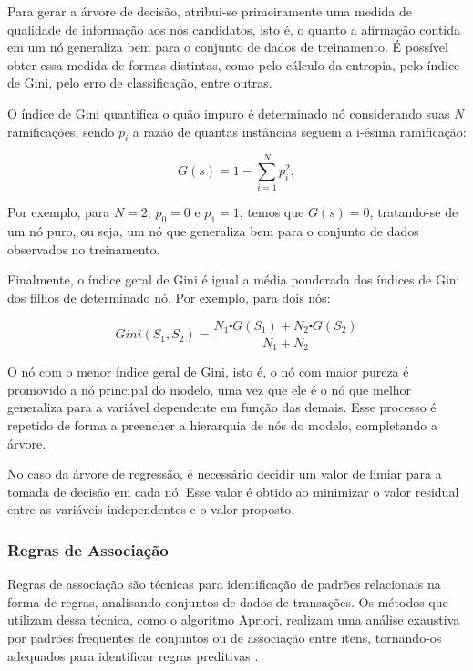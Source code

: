 Para gerar a árvore de decisão, atribui-se primeiramente uma medida de qualidade
de informação aos nós candidatos, isto é, o quanto a afirmação contida em um nó
generaliza bem para o conjunto de dados de treinamento. É possível obter essa
medida de formas distintas, como pelo cálculo da entropia, pelo índice de Gini,
pelo erro de classificação, entre outras.

O índice de Gini quantifica o
quão impuro é determinado nó considerando suas $N$ ramificações, sendo $p_i$
a razão de quantas instâncias seguem a i-ésima ramificação:

\begin{equation}
    G(s) = 1 - \sum_{i=1}^{N} p_{i}^{2},
\end{equation}

Por exemplo, para $N = 2$, $p_{0} = 0$ e $p_{1} = 1$, temos que $G(s) = 0$,
tratando-se de um nó puro, ou seja, um nó que generaliza bem para o conjunto de
dados observados no treinamento.

Finalmente, o índice geral de Gini é igual a média ponderada dos índices de Gini
dos filhos de determinado nó. Por exemplo, para dois nós:


\begin{equation}
    Gini(S_1, S_2) = \frac{N_1 \centerdot G(S_1) +  N_2 \centerdot G(S_2)}{N_1 + N_2}
\end{equation}

O nó com o menor índice geral de Gini, isto é, o nó com maior pureza é promovido
a nó principal do modelo, uma vez que ele é o nó que melhor generaliza para a
variável dependente em função das demais. Esse processo é repetido de forma a
preencher a hierarquia de nós do modelo, completando a árvore.

No caso da árvore de regressão, é necessário decidir um valor de limiar para a
tomada de decisão em cada nó. Esse valor é obtido ao minimizar o valor residual
entre as variáveis independentes e o valor proposto.

\subsubsection{Regras de Associação}
Regras de associação são técnicas para identificação de padrões relacionais
na forma de regras, analisando conjuntos de dados de transações. Os métodos que
utilizam dessa técnica, como o algoritmo Apriori, realizam uma análise exaustiva
por padrões frequentes de conjuntos ou de associação entre itens, tornando-os
adequados para identificar regras preditivas \cite{jannach2011recommender}.

